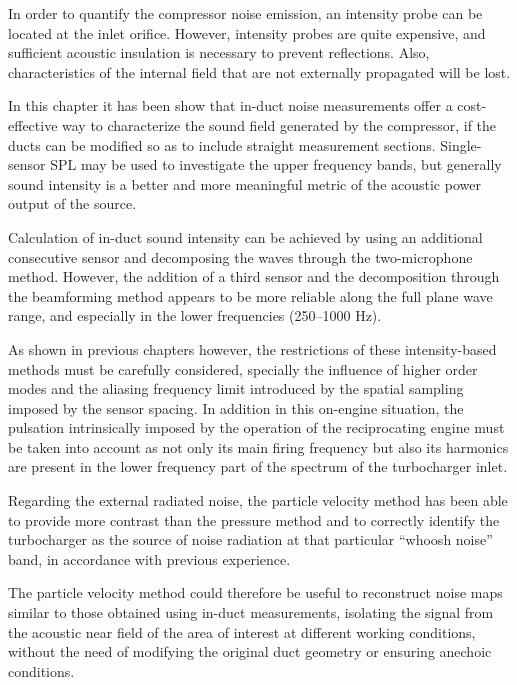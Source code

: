 In order to quantify the compressor noise emission, an intensity probe can be located at the inlet orifice. However, intensity probes are quite expensive, and sufficient acoustic insulation is necessary to prevent reflections. Also, characteristics of the internal field that are not externally propagated will be lost.

In this chapter it has been show that in-duct noise measurements offer a cost-effective way to characterize the sound field generated by the compressor, if the ducts can be modified so as to include straight measurement sections. Single-sensor SPL may be used to investigate the upper frequency bands, but generally sound intensity is a better and more meaningful metric of the acoustic power output of the source.

Calculation of in-duct sound intensity can be achieved by using an additional consecutive sensor and decomposing the waves through the two-microphone method. However, the addition of a third sensor and the decomposition through the beamforming method appears to be more reliable along the full plane wave range, and especially in the lower frequencies (250--1000 Hz).

As shown in previous chapters however, the restrictions of these intensity-based methods must be carefully considered, specially the influence of higher order modes and the aliasing frequency limit introduced by the spatial sampling imposed by the sensor spacing. In addition in this on-engine situation, the pulsation intrinsically imposed by the operation of the reciprocating engine must be taken into account as not only its main firing frequency but also its harmonics are present in the lower frequency part of the spectrum of the turbocharger inlet.

Regarding the external radiated noise, the particle velocity method has been able to provide more contrast than the pressure method and to correctly identify the turbocharger as the source of noise radiation at that particular ``whoosh noise'' band, in accordance with previous experience.

The particle velocity method could therefore be useful to reconstruct noise maps similar to those obtained using in-duct measurements, isolating the signal from the acoustic near field of the area of interest at different working conditions, without the need of modifying the original duct geometry or ensuring anechoic conditions.
